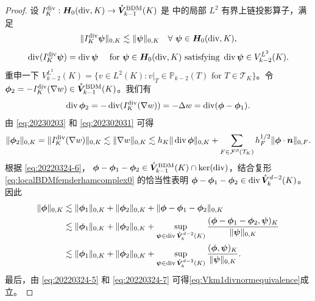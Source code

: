 \begin{proof}
设 $I_K^{\operatorname{div}}:
\boldsymbol{H}_0(\operatorname{div},K)\to\mathring{\boldsymbol{V}}_{k-1}^{\mathrm{BDM}}(K)$
是 \cite{ArnoldGuzman2021,FalkWinther2014} 中的局部 $L^2$ 有界上链投影算子，满足
\begin{equation}\label{eq:20230203}  
\|I_K^{\operatorname{div}}\boldsymbol{\psi}\|_{0,K} \lesssim \|\boldsymbol{\psi}\|_{0,K}\quad\forall~\boldsymbol{\psi}\in \boldsymbol{H}_0(\operatorname{div},K),
\end{equation}
\[
\operatorname{div}(I_K^{\operatorname{div}}\boldsymbol{\psi})=\operatorname{div}\boldsymbol{\psi} \quad \textrm{ for } \boldsymbol{\psi}\in \boldsymbol{H}_0(\operatorname{div},K) \textrm{ satisfying } \operatorname{div}\boldsymbol{\psi}\in V_{k-2}^{L^2}(K).
\]
重申一下 $
V_{k-2}^{L^2}(K)=\{v\in L^2(K): v|_{T}\in \mathbb P_{k-2}(T) \textrm{ for } T\in\mathcal T_K\}
$。令 $\boldsymbol{\phi}_2=-I_K^{\operatorname{div}}(\nabla w)\in\mathring{\boldsymbol{V}}_{k-1}^{\mathrm{BDM}}(K)$。我们有
\begin{equation}\label{eq:20220324-6}
\operatorname{div}\boldsymbol{\phi}_2=-\operatorname{div}(I_K^{\operatorname{div}}(\nabla w))=-\Delta w=\operatorname{div}(\boldsymbol{\phi}-\boldsymbol{\phi}_1).
\end{equation}
由 \eqref{eq:20230203} 和 \eqref{eq:202302031} 可得
\begin{equation}\label{eq:20220324-7}
\|\boldsymbol{\phi}_2\|_{0,K}=\|I_K^{\operatorname{div}}(\nabla w)\|_{0,K}\lesssim \|\nabla w\|_{0,K}\lesssim h_K\|\operatorname{div}\boldsymbol{\phi}\|_{0,K} +\sum_{F\in\mathcal F^{\partial}(\mathcal T_K)}h_F^{1/2}\|\boldsymbol{\phi}\cdot\boldsymbol{n}\|_{0,F}.
\end{equation}
根据
\eqref{eq:20220324-6}，
$\boldsymbol{\phi}-\boldsymbol{\phi}_1-\boldsymbol{\phi}_2\in
\mathring{\boldsymbol{V}}_{k-1}^{\mathrm{BDM}}(K)\cap\ker(\operatorname{div})$，结合复形
\eqref{eq:localBDMfemderhamcomplex0} 的恰当性表明
$\boldsymbol{\phi}-\boldsymbol{\phi}_1-\boldsymbol{\phi}_2\in\operatorname{div}\mathring{\boldsymbol{V}}_{k}^{d-2}(K)$。因此
\begin{align*}
\|\boldsymbol{\phi}\|_{0,K}&\lesssim \|\boldsymbol{\phi}_1\|_{0,K}+\|\boldsymbol{\phi}_2\|_{0,K}+\|\boldsymbol{\phi}-\boldsymbol{\phi}_1-\boldsymbol{\phi}_2\|_{0,K} \\
&\lesssim \|\boldsymbol{\phi}_1\|_{0,K}+\|\boldsymbol{\phi}_2\|_{0,K}+\sup_{\boldsymbol{\psi}\in\operatorname{div}\mathring{\boldsymbol{V}}_{k}^{d-2}(K)}\frac{(\boldsymbol{\phi}-\boldsymbol{\phi}_1-\boldsymbol{\phi}_2, \boldsymbol{\psi})_K}{\|\boldsymbol{\psi}\|_{0,K}} \\
&\lesssim \|\boldsymbol{\phi}_1\|_{0,K}+\|\boldsymbol{\phi}_2\|_{0,K}+\sup_{\boldsymbol{\psi}\in\operatorname{div}\mathring{\boldsymbol{V}}_{k}^{d-2}(K)}\frac{(\boldsymbol{\phi}, \boldsymbol{\psi})_K}{\|\boldsymbol{\psi}\|_{0,K}}.
\end{align*}
最后，由 \eqref{eq:20220324-5} 和 \eqref{eq:20220324-7}
可得\eqref{eq:Vkm1divnormequivalence}成立。
\end{proof}
